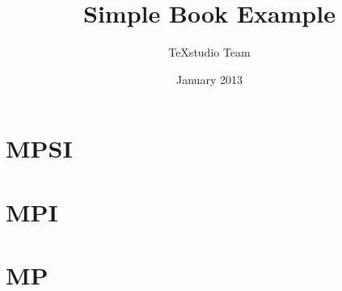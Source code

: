 \documentclass[a4paper,12pt,french]{book}
\begin{document}
\author{TeXstudio Team}
\title{Simple Book Example}
\date{January 2013}

\frontmatter
\maketitle
\tableofcontents

\mainmatter
\part{MPSI}


\part{MPI}

\part{MP}


\backmatter
\end{document}
